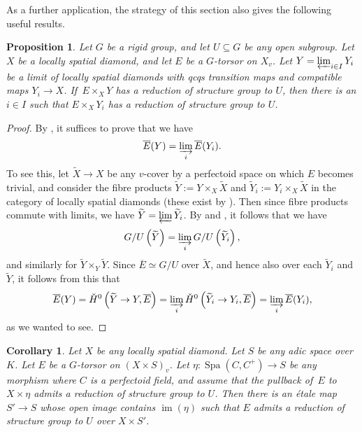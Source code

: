 \documentclass[11pt]{amsart}
\numberwithin{equation}{section}
\newtheorem{Proposition}[thm]{Proposition}
\newtheorem{Corollary}[thm]{Corollary}
\theoremstyle{definition}
\theoremstyle{remark}
\newcommand{\im}{\operatorname{im}}
\newcommand{\Spa}{\operatorname{Spa}}
\newcommand{\wt}{\widetilde}
\newcommand{\cH}{{\ifmmode \check{H}\else{\v{C}ech}\fi}}
\begin{document}
As a further application, the strategy of this section also gives  the following useful results. 

\begin{Proposition}\label{p:reduction-of-strgrp-in-tilde-limits}
	Let $G$ be a rigid group, and let $U\subseteq G$ be any open subgroup.
	Let $X$ be a locally spatial diamond, and let $E$ be a $G$-torsor on $X_v$. Let $Y=\varprojlim_{i\in I} Y_i$ be a limit of locally spatial diamonds with qcqs transition maps and compatible maps $Y_i\to X$. If\, $E\times_XY$ has a reduction of structure group to $U$, then there is an $i\in I$ such that $E\times_XY_i$ has a reduction of structure group to $U$.
\end{Proposition}

\begin{proof}
	By , it suffices to prove that we have
	\[ \overline{E}(Y)=\varinjlim_i \overline E(Y_i).\]
	To see this, let $\wt X\to X$ be any $v$-cover by a perfectoid space on which $E$ becomes trivial, and consider the fibre products $\wt Y:=Y\times_X\wt X$ and $\wt Y_i:=Y_i\times_X\wt X$ in the category of locally spatial diamonds (these exist by \cite[Corollary 11.29]{etale-cohomology-of-diamonds}). Then since fibre products commute with limits, we have $\wt Y=\varprojlim \wt Y_i$. By  and  ,   it follows that we have
	\[ G/U\left(\wt Y\right)=\varinjlim_i G/U\left(\wt Y_i\right),\]
	and similarly for $\wt Y\times_Y\wt Y$.
	Since $\overline{E}\simeq G/U$ over $\wt X$, and hence also over each $\wt Y_i$ and $\wt Y$,  it follows from this that
	\[ \overline{E}(Y)=\cH^0\left(\wt Y\to Y,\overline{E}\right)=\varinjlim_i \cH^0\left(\wt Y_i\to Y_i,\overline{E}\right)=\varinjlim_i\overline{E}(Y_i),\]
	as we wanted to see.
\end{proof}

\begin{Corollary}
	Let $X$ be any locally spatial diamond. Let $S$ be any adic space over $K$. Let $E$ be a $G$-torsor on $(X\times S)_v$. Let $\eta\colon \Spa(C,C^+)\to S$ be any morphism where $C$ is a perfectoid field, and assume that the pullback of\, $E$ to $X\times \eta$ admits a reduction of structure group to $U$. Then there is an \'etale map $S'\to S$ whose open image contains $\im(\eta)$ such that $E$ admits a reduction of structure group to $U$ over $X\times S'$.
\end{Corollary}
\end{document}
